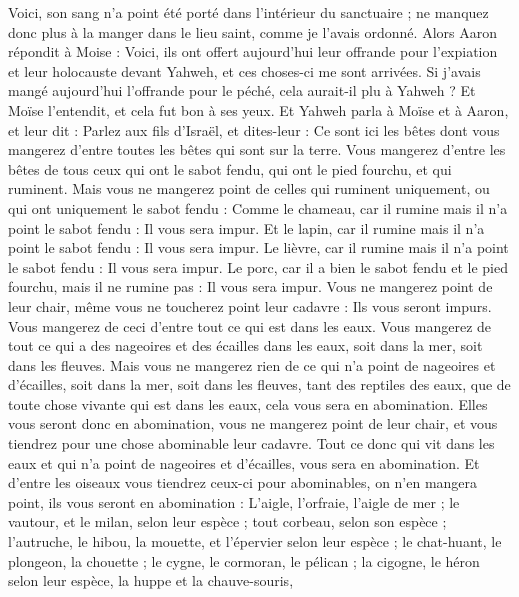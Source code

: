 \begin{multicols}{2}
Voici, son sang n'a point été porté dans l'intérieur du sanctuaire ; ne manquez donc plus à la manger dans le lieu saint, comme je l'avais ordonné.
Alors Aaron répondit à Moise : Voici, ils ont offert aujourd'hui leur offrande pour l'expiation et leur holocauste devant Yahweh, et ces choses-ci me sont arrivées. Si j'avais mangé aujourd'hui l'offrande pour le péché, cela aurait-il plu à Yahweh ?
Et Moïse l'entendit, et cela fut bon à ses yeux.
\VerseOne{}Et Yahweh parla à Moïse et à Aaron, et leur dit :
Parlez aux fils d'Israël, et dites-leur : Ce sont ici les bêtes dont vous mangerez d'entre toutes les bêtes qui sont sur la terre.
Vous mangerez d'entre les bêtes de tous ceux qui ont le sabot fendu, qui ont le pied fourchu, et qui ruminent.
Mais vous ne mangerez point de celles qui ruminent uniquement, ou qui ont uniquement le sabot fendu : Comme le chameau, car il rumine mais il n'a point le sabot fendu : Il vous sera impur.
Et le lapin, car il rumine mais il n'a point le sabot fendu : Il vous sera impur.
Le lièvre, car il rumine mais il n'a point le sabot fendu : Il vous sera impur.
Le porc, car il a bien le sabot fendu et le pied fourchu, mais il ne rumine pas : Il vous sera impur.
Vous ne mangerez point de leur chair, même vous ne toucherez point leur cadavre : Ils vous seront impurs.
Vous mangerez de ceci d'entre tout ce qui est dans les eaux. Vous mangerez de tout ce qui a des nageoires et des écailles dans les eaux, soit dans la mer, soit dans les fleuves.
Mais vous ne mangerez rien de ce qui n'a point de nageoires et d'écailles, soit dans la mer, soit dans les fleuves, tant des reptiles des eaux, que de toute chose vivante qui est dans les eaux, cela vous sera en abomination.
Elles vous seront donc en abomination, vous ne mangerez point de leur chair, et vous tiendrez pour une chose abominable leur cadavre.
Tout ce donc qui vit dans les eaux et qui n'a point de nageoires et d'écailles, vous sera en abomination.
Et d'entre les oiseaux vous tiendrez ceux-ci pour abominables, on n'en mangera point, ils vous seront en abomination : L'aigle, l'orfraie, l'aigle de mer ;
le vautour, et le milan, selon leur espèce ;
tout corbeau, selon son espèce ;
l'autruche, le hibou, la mouette, et l'épervier selon leur espèce ;
le chat-huant, le plongeon, la chouette ;
le cygne, le cormoran, le pélican ;
la cigogne, le héron selon leur espèce, la huppe et la chauve-souris,

\end{multicols}
